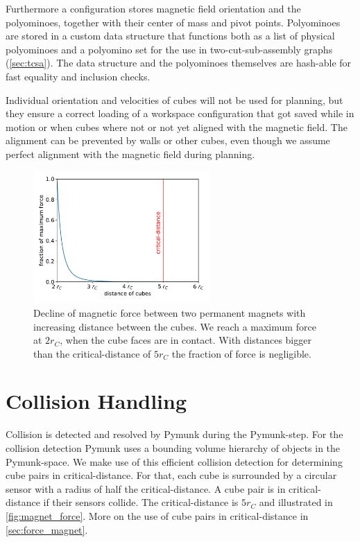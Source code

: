 Furthermore a configuration stores magnetic field orientation and the polyominoes, together with their center of mass and pivot points.
Polyominoes are stored in a custom data structure that functions both as a list of physical polyominoes and a polyomino set for the use in two-cut-sub-assembly graphs (\autoref{sec:tcsa}).
The data structure and the polyominoes themselves are hash-able for fast equality and inclusion checks.

Individual orientation and velocities of cubes will not be used for planning, but they ensure a correct loading of a workspace configuration that got saved while in motion or when cubes where not or not yet aligned with the magnetic field.
The alignment can be prevented by walls or other cubes, even though we assume perfect alignment with the magnetic field during planning.

\begin{figure}
	\centering
	\includegraphics[width=0.6\textwidth]{figures/plots/magnet_force.pdf}
	\caption[Declining magnetic forces with increasing cube distance.]{Decline of magnetic force between two permanent magnets with increasing distance between the cubes. We reach a maximum force at $2 r_C$, when the cube faces are in contact. With distances bigger than the critical-distance of $5 r_C$ the fraction of force is negligible.}
	\label{fig:magnet_force}
\end{figure}

\section{Collision Handling}
\label{sec:coll_handling}

Collision is detected and resolved by Pymunk during the Pymunk-step.
For the collision detection Pymunk uses a bounding volume hierarchy of objects in the Pymunk-space.
We make use of this efficient collision detection for determining cube pairs in critical-distance.
For that, each cube is surrounded by a circular sensor with a radius of half the critical-distance.
A cube pair is in critical-distance if their sensors collide.
The critical-distance is $5 r_C$ and illustrated in \autoref{fig:magnet_force}.
More on the use of cube pairs in critical-distance in \autoref{sec:force_magnet}.

